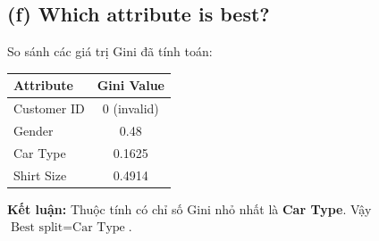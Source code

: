 \subsection*{(f) Which attribute is best?}
So sánh các giá trị Gini đã tính toán:
\begin{table}[H]
    \centering
    \begin{tabular}{|l|c|}
        \hline
        \textbf{Attribute} & \textbf{Gini Value} \\
        \hline
        Customer ID & 0 (invalid) \\ \hline
        Gender & 0.48 \\ \hline
        Car Type & 0.1625 \\ \hline
        Shirt Size & 0.4914 \\ \hline
    \end{tabular}
\end{table}
\textbf{Kết luận:} Thuộc tính có chỉ số Gini nhỏ nhất là \textbf{Car Type}. Vậy $\text{Best split} = \text{Car Type}$.